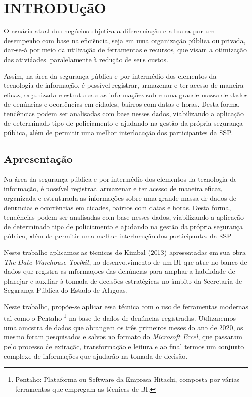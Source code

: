 %
%

\chapter{INTRODU\c{c}\~{a}O}\label{chap:introducao}

O cenário atual dos negócios objetiva a diferenciação e a busca por um desempenho com base na eficiência, seja em uma organiza\c{c}\~{a}o pública ou privada, dar-se-\'{a} por meio da utilização de ferramentas e recursos, que visam a otimiza\c{c}\~{a}o das atividades, paralelamente à redução de seus custos.

Assim, na \'{a}rea da seguran\c{c}a pública e por intermédio dos elementos da tecnologia de informação, é possível registrar, armazenar e ter acesso de maneira eficaz, organizada e estruturada as informações sobre uma grande massa de dados de denúncias e ocorrências em cidades, bairros com datas e horas. Desta forma, tendências podem ser analisadas com base nesses dados, viabilizando a aplica\c{c}\~{a}o de determinado tipo de policiamento e ajudando na gestão da própria seguran\c{c}a pública, além de permitir uma melhor interlocução dos participantes da SSP.

\section{Apresenta\c{c}\~{a}o}

Na \'{a}rea da seguran\c{c}a pública e por intermédio dos elementos da tecnologia de informação, é possível registrar, armazenar e ter acesso de maneira eficaz, organizada e estruturada as informações sobre uma grande massa de dados de denúncias e ocorrências em cidades, bairros com datas e horas. Desta forma, tendências podem ser analisadas com base nesses dados, viabilizando a aplica\c{c}\~{a}o de determinado tipo de policiamento e ajudando na gestão da própria seguran\c{c}a pública, além de permitir uma melhor interlocução dos participantes da SSP.

Neste trabalho aplicamos as t\'{e}cnicas de Kimbal (2013)\cite{dw-kimball-2013} apresentadas em sua obra \textit{The Data Warehouse Toolkit}, no desenvolvimento de um BI que atue no banco de dados que registra as informa\c{c}ões das denúncias para ampliar a habilidade de planejar e auxiliar \`{a} tomada de decisões estrat\'{e}gicas no âmbito da Secretaria de Seguran\c{c}a Pública do Estado de Alagoas. 

Neste trabalho, propõe-se aplicar essa t\'{e}cnica com o uso de ferramentas modernas tal como o Pentaho \footnote{Pentaho: Plataforma ou Software da Empresa Hitachi, composta por v\'{a}rias ferramentas que empregam as t\'{e}cnicas de BI.} na base de dados de denúncias registradas. Utilizaremos uma amostra de dados que abrangem os três primeiros meses do ano de 2020, os mesmo foram pesquisados e salvos no formato do \textit{Microsoft Excel}, que passaram pelo processo de extra\c{c}\~{a}o, transforma\c{c}\~{a}o e leitura e ao final termos um conjunto complexo de informa\c{c}ões que ajudar\~{a}o na tomada de decis\~{a}o.

